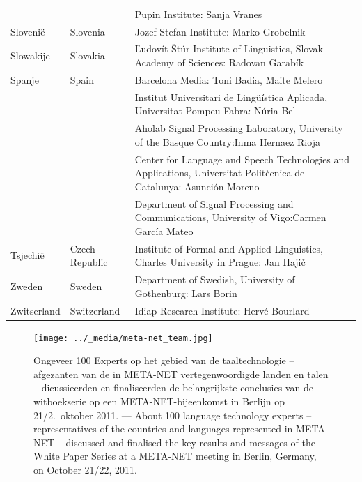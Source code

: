 \begin{longtable}{@{}llp{113mm}@{}}
  & & Pupin Institute: Sanja Vranes \\ \addlinespace
  Sloveni{\"e} & \textcolor{grey1}{Slovenia} & Jozef Stefan Institute: Marko Grobelnik \\ \addlinespace
  Slowakije & \textcolor{grey1}{Slovakia} & Ľudovít Štúr Institute of Linguistics, Slovak Academy of Sciences: Radovan Garabík \\ \addlinespace
  Spanje & \textcolor{grey1}{Spain} & Barcelona Media: Toni Badia, Maite Melero \\ \addlinespace
  & & Institut Universitari de Lingüística Aplicada, Universitat Pompeu Fabra: Núria Bel \\ \addlinespace
  & & Aholab Signal Processing Laboratory, University of the Basque Country:\newline Inma Hernaez Rioja \\ \addlinespace
  & & Center for Language and Speech Technologies and Applications, Universitat Politècnica de Catalunya:  Asunción Moreno \\ \addlinespace
  & & Department of Signal Processing and Communications, University of Vigo:\newline Carmen García Mateo \\ \addlinespace
  Tsjechi{\"e} & \textcolor{grey1}{Czech Republic} & Institute of Formal and Applied Linguistics, Charles University in Prague: Jan Hajič \\ \addlinespace


  Zweden & \textcolor{grey1}{Sweden} & Department of Swedish, University of Gothenburg: Lars Borin
  \\ \addlinespace
  Zwitserland & \textcolor{grey1}{Switzerland} & Idiap Research Institute: Hervé Bourlard
\end{longtable}
\normalsize

\renewcommand*{\figureformat}{}
\renewcommand*{\captionformat}{}

\begin{figure}[htbp]
  \center
  \texttt{[image: ../\_media/meta-net\_team.jpg]}
  \caption{Ongeveer 100 Experts op het gebied van de taaltechnologie -- afgezanten van de in META-NET ver\-te\-gen\-woor\-dig\-de landen en talen  -- dicussieerden en finaliseerden de belangrijkste conclusies van de witboekserie op een META-NET-bijeenkomst in Berlijn op 21/2.~oktober 2011. --- \textcolor{grey1}{About 100 language technology experts -- representatives of the countries and languages represented in META-NET -- discussed and finalised the key results and messages of the White Paper Series at a META-NET meeting in Berlin, Germany, on October 21/22, 2011.}}
  \medskip
\end{figure}

